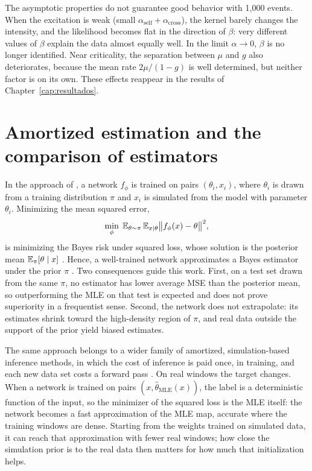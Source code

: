 \label{sec:identificabilidade}
The asymptotic properties do not guarantee good behavior with 1,000 events. When the
excitation is weak (small \(\alpha_{\mathrm{self}}+\alpha_{\mathrm{cross}}\)), the
kernel barely changes the intensity, and the likelihood becomes flat in the direction
of \(\beta\): very different values of \(\beta\) explain the data almost equally well.
In the limit \(\alpha\to0\), \(\beta\) is no longer identified. Near criticality, the
separation between \(\mu\) and \(g\) also deteriorates, because the mean rate
\(2\mu/(1-g)\) is well determined, but neither factor is on its own. These effects
reappear in the results of Chapter~\ref{cap:resultados}.

\section{Amortized estimation and the comparison of estimators}
\label{sec:bayes}

In the approach of \citet{lee2023}, a network \(f_\phi\) is trained on pairs
\((\theta_i,x_i)\), where \(\theta_i\) is drawn from a training distribution \(\pi\)
and \(x_i\) is simulated from the model with parameter \(\theta_i\). Minimizing the
mean squared error,
\[
  \min_\phi\;\mathbb{E}_{\theta\sim\pi}\,\mathbb{E}_{x\mid\theta}
  \bigl\lVert f_\phi(x)-\theta\bigr\rVert^2,
\]
is minimizing the Bayes risk under squared loss, whose solution is the posterior mean
\(\mathbb{E}_\pi[\theta\mid x]\) \citep{lehmann1998}. Hence, a well-trained network
approximates a Bayes estimator under the prior \(\pi\)
\citep{sainsburydale2024,lenzi2023}. Two consequences guide this work. First, on a
test set drawn from the same \(\pi\), no estimator has lower average MSE than the
posterior mean, so outperforming the MLE on that test is expected and does not prove
superiority in a frequentist sense. Second, the network does not extrapolate: its
estimates shrink toward the high-density region of \(\pi\), and real data outside the
support of the prior yield biased estimates.

The same approach belongs to a wider family of amortized, simulation-based inference methods,
in which the cost of inference is paid once, in training, and each new data set costs a
forward pass \citep{cranmer2020,radev2022}. On real windows the target changes. When a
network is trained on pairs \((x,\hat\theta_{\mathrm{MLE}}(x))\), the label is a deterministic
function of the input, so the minimizer of the squared loss is the MLE itself: the network
becomes a fast approximation of the MLE map, accurate where the training windows are dense.
Starting from the weights trained on simulated data, it can reach that approximation with
fewer real windows; how close the simulation prior is to the real data then matters for how
much that initialization helps.

